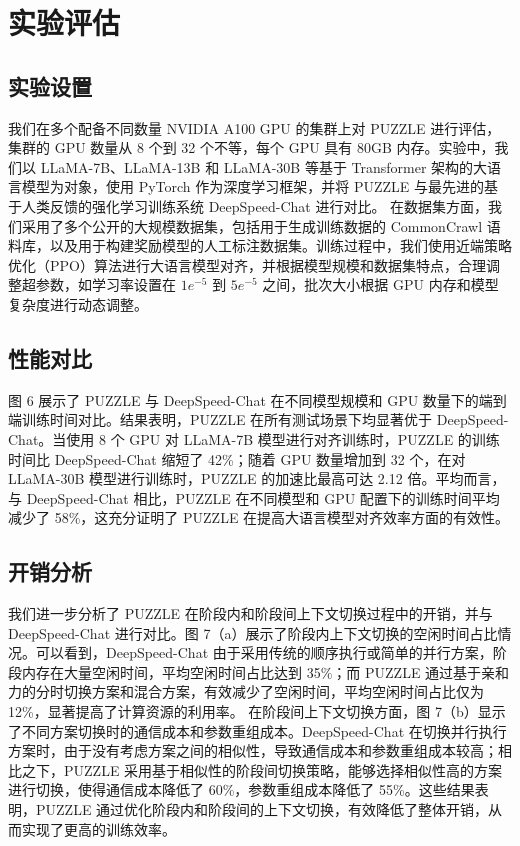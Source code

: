 \section{实验评估}
\subsection{实验设置}
我们在多个配备不同数量 NVIDIA A100 GPU 的集群上对 PUZZLE 进行评估，集群的 GPU 数量从 8 个到 32 个不等，每个 GPU 具有 80GB 内存。实验中，我们以 LLaMA-7B、LLaMA-13B 和 LLaMA-30B 等基于 Transformer 架构的大语言模型为对象，使用 PyTorch 作为深度学习框架，并将 PUZZLE 与最先进的基于人类反馈的强化学习训练系统 DeepSpeed-Chat 进行对比。
在数据集方面，我们采用了多个公开的大规模数据集，包括用于生成训练数据的 CommonCrawl 语料库，以及用于构建奖励模型的人工标注数据集。训练过程中，我们使用近端策略优化（PPO）算法进行大语言模型对齐，并根据模型规模和数据集特点，合理调整超参数，如学习率设置在 \(1e^{-5}\) 到 \(5e^{-5}\) 之间，批次大小根据 GPU 内存和模型复杂度进行动态调整。
\subsection{性能对比}
图 6 展示了 PUZZLE 与 DeepSpeed-Chat 在不同模型规模和 GPU 数量下的端到端训练时间对比。结果表明，PUZZLE 在所有测试场景下均显著优于 DeepSpeed-Chat。当使用 8 个 GPU 对 LLaMA-7B 模型进行对齐训练时，PUZZLE 的训练时间比 DeepSpeed-Chat 缩短了 42\%；随着 GPU 数量增加到 32 个，在对 LLaMA-30B 模型进行训练时，PUZZLE 的加速比最高可达 2.12 倍。平均而言，与 DeepSpeed-Chat 相比，PUZZLE 在不同模型和 GPU 配置下的训练时间平均减少了 58\%，这充分证明了 PUZZLE 在提高大语言模型对齐效率方面的有效性。
\subsection{开销分析}
我们进一步分析了 PUZZLE 在阶段内和阶段间上下文切换过程中的开销，并与 DeepSpeed-Chat 进行对比。图 7（a）展示了阶段内上下文切换的空闲时间占比情况。可以看到，DeepSpeed-Chat 由于采用传统的顺序执行或简单的并行方案，阶段内存在大量空闲时间，平均空闲时间占比达到 35\%；而 PUZZLE 通过基于亲和力的分时切换方案和混合方案，有效减少了空闲时间，平均空闲时间占比仅为 12\%，显著提高了计算资源的利用率。
在阶段间上下文切换方面，图 7（b）显示了不同方案切换时的通信成本和参数重组成本。DeepSpeed-Chat 在切换并行执行方案时，由于没有考虑方案之间的相似性，导致通信成本和参数重组成本较高；相比之下，PUZZLE 采用基于相似性的阶段间切换策略，能够选择相似性高的方案进行切换，使得通信成本降低了 60\%，参数重组成本降低了 55\%。这些结果表明，PUZZLE 通过优化阶段内和阶段间的上下文切换，有效降低了整体开销，从而实现了更高的训练效率。
